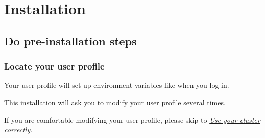 \documentclass[letterpaper,10pt,english]{sphinxmanual}
\begin{document}
\chapter{Installation}
\label{1_0_installation:installation}\label{1_0_installation::doc}

\section{Do pre-installation steps}
\label{1_0_installation:do-pre-installation-steps}

\subsection{Locate your user profile}
\label{1_0_installation:locate-your-user-profile}
Your user profile will set up environment variables like  when you log in.

This installation will ask you to modify your user profile several times.

If you are comfortable modifying your user profile, please skip to {\hyperref[1_0_installation:use-cluster-correctly]{\emph{Use your cluster correctly}}}.
\end{document}
